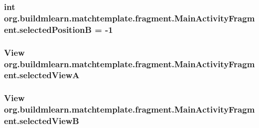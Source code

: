 \subsubsection[{\texorpdfstring{selected\+PositionB}{selectedPositionB}}]{\setlength{\rightskip}{0pt plus 5cm}int org.\+buildmlearn.\+matchtemplate.\+fragment.\+Main\+Activity\+Fragment.\+selected\+PositionB = -\/1\hspace{0.3cm}{\ttfamily [private]}}\hypertarget{classorg_1_1buildmlearn_1_1matchtemplate_1_1fragment_1_1MainActivityFragment_a667c37f2984f5d6c44605c965d64bb83}{}\label{classorg_1_1buildmlearn_1_1matchtemplate_1_1fragment_1_1MainActivityFragment_a667c37f2984f5d6c44605c965d64bb83}
\subsubsection[{\texorpdfstring{selected\+ViewA}{selectedViewA}}]{\setlength{\rightskip}{0pt plus 5cm}View org.\+buildmlearn.\+matchtemplate.\+fragment.\+Main\+Activity\+Fragment.\+selected\+ViewA\hspace{0.3cm}{\ttfamily [private]}}\hypertarget{classorg_1_1buildmlearn_1_1matchtemplate_1_1fragment_1_1MainActivityFragment_a858269b16f4e5664d3e29d3028cf4cdc}{}\label{classorg_1_1buildmlearn_1_1matchtemplate_1_1fragment_1_1MainActivityFragment_a858269b16f4e5664d3e29d3028cf4cdc}
\subsubsection[{\texorpdfstring{selected\+ViewB}{selectedViewB}}]{\setlength{\rightskip}{0pt plus 5cm}View org.\+buildmlearn.\+matchtemplate.\+fragment.\+Main\+Activity\+Fragment.\+selected\+ViewB\hspace{0.3cm}{\ttfamily [private]}}\hypertarget{classorg_1_1buildmlearn_1_1matchtemplate_1_1fragment_1_1MainActivityFragment_a670f583dfa426ca1b7d740ba74a08c6c}{}\label{classorg_1_1buildmlearn_1_1matchtemplate_1_1fragment_1_1MainActivityFragment_a670f583dfa426ca1b7d740ba74a08c6c}


